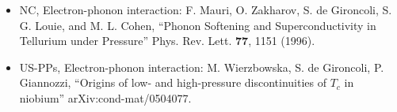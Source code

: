 \documentclass[12pt,a4paper]{article}
\begin{document}
\begin{itemize}
\item
NC, Electron-phonon interaction:
F. Mauri, O. Zakharov, S. de Gironcoli, S. G. Louie, and M. L. Cohen,
``Phonon Softening and Superconductivity in Tellurium under Pressure''
Phys. Rev. Lett. {\bf 77}, 1151 (1996).

\item
US-PPs, Electron-phonon interaction:
M. Wierzbowska, S. de Gironcoli, P. Giannozzi,
``Origins of low- and high-pressure discontinuities of $T_{c}$ in niobium''
arXiv:cond-mat/0504077.

\end{itemize}
\end{document}
